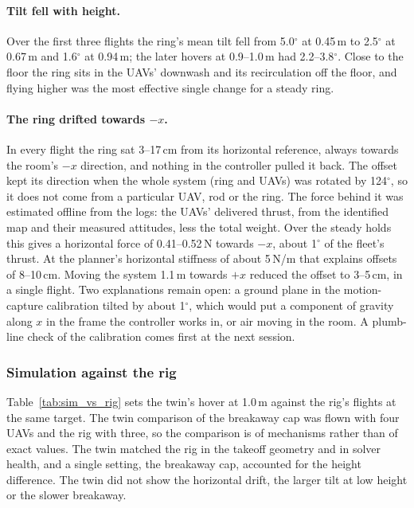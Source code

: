 \paragraph{Tilt fell with height.} Over the first three flights the ring's mean tilt fell from
5.0$^\circ$ at 0.45\,m to 2.5$^\circ$ at 0.67\,m and 1.6$^\circ$ at 0.94\,m; the later hovers at
0.9--1.0\,m had 2.2--3.8$^\circ$. Close to the floor the ring sits in the UAVs' downwash and its
recirculation off the floor, and flying higher was the most effective single change for a steady
ring.

\paragraph{The ring drifted towards $-x$.} In every flight the ring sat 3--17\,cm from its horizontal
reference, always towards the room's $-x$ direction, and nothing in the controller pulled it back.
The offset kept its direction when the whole system (ring and UAVs) was rotated by 124$^\circ$, so it
does not come from a particular UAV, rod or the ring. The force behind it was estimated offline from
the logs: the UAVs' delivered thrust, from the identified map and their measured attitudes, less the
total weight. Over the steady holds this gives a horizontal force of 0.41--0.52\,N towards $-x$,
about 1$^\circ$ of the fleet's thrust. At the planner's horizontal stiffness of about 5\,N/m that
explains offsets of 8--10\,cm. Moving the system 1.1\,m towards $+x$ reduced the offset to 3--5\,cm,
in a single flight. Two explanations remain open: a ground plane in the motion-capture calibration
tilted by about 1$^\circ$, which would put a component of gravity along $x$ in the frame the
controller works in, or air moving in the room. A plumb-line check of the calibration comes first at
the next session.

\subsubsection{Simulation against the rig}
\label{sec:sim_to_real}

Table~\ref{tab:sim_vs_rig} sets the twin's hover at 1.0\,m against the rig's flights at the same
target. The twin comparison of the breakaway cap was flown with four UAVs and the rig with three, so
the comparison is of mechanisms rather than of exact values. The twin matched the rig in the takeoff
geometry and in solver health, and a single setting, the breakaway cap, accounted for the height
difference. The twin did not show the horizontal drift, the
larger tilt at low height or the slower breakaway.

